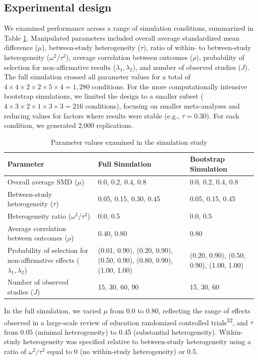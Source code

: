\documentclass[
  american,
  man, donotrepeattitle,floatsintext]{apa7}
\begin{document}
\subsection{Experimental design}\label{experimental-design}

We examined performance across a range of simulation conditions, summarized in Table \ref{tab:sim-design}. Manipulated parameters included overall average standardized mean difference (\(\mu\)), between-study heterogeneity (\(\tau\)), ratio of within- to between-study heterogeneity (\(\omega^2 / \tau^2\)), average correlation between outcomes (\(\rho\)), probability of selection for non-affirmative results (\(\lambda_1, \lambda_2\)), and number of observed studies (\(J\)). The full simulation crossed all parameter values for a total of \(4 \times 4 \times 2 \times 2 \times 5 \times 4 = 1,280\) conditions. For the more computationally intensive bootstrap simulations, we limited the design to a smaller subset (\(4 \times 3 \times 2 \times 1 \times 3 \times 3 = 216\) conditions), focusing on smaller meta-analyses and reducing values for factors where results were stable (e.g., \(\tau = 0.30\)). For each condition, we generated 2,000 replications.

\begin{table}
\centering
\caption{\label{tab:sim-design}Parameter values examined in the simulation study}
\centering
\begin{tabular}[t]{>{\raggedright\arraybackslash}p{2.5in}ll}
\toprule
Parameter & Full Simulation & Bootstrap Simulation\\
\midrule
Overall average SMD ($\mu$) & 0.0, 0.2, 0.4, 0.8 & 0.0, 0.2, 0.4, 0.8\\
Between-study heterogeneity ($\tau$) & 0.05, 0.15, 0.30, 0.45 & 0.05, 0.15, 0.45\\
Heterogeneity ratio ($\omega^2 / \tau^2$) & 0.0, 0.5 & 0.0, 0.5\\
Average correlation between outcomes ($\rho$) & 0.40, 0.80 & 0.80\\
Probability of selection for non-affirmative effects ($\lambda_1, \lambda_2$) & (0.01, 0.90), (0.20, 0.90), (0.50, 0.90), (0.80, 0.90), (1.00, 1.00) & (0.20, 0.90), (0.50, 0.90), (1.00, 1.00)\\
\addlinespace
Number of observed studies ($J$) & 15, 30, 60, 90 & 15, 30, 60\\
\bottomrule
\end{tabular}
\end{table}

In the full simulation, we varied \(\mu\) from 0.0 to 0.80, reflecting the range of effects observed in a large-scale review of education randomized controlled trials\textsuperscript{32}, and \(\tau\) from 0.05 (minimal heterogeneity) to 0.45 (substantial heterogeneity). Within-study heterogeneity was specified relative to between-study heterogeneity using a ratio of \(\omega^2 / \tau^2\) equal to 0 (no within-study heterogeneity) or 0.5.
\end{document}
